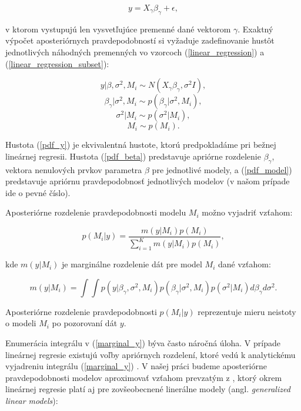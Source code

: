\begin{equation} \label{linear_regression_subset}
y = X_{\gamma} \beta_{\gamma} + \epsilon,
\end{equation}

v ktorom vystupujú len vysvetľujúce premenné dané vektorom \( \gamma \).
Exaktný výpočet aposteriórnych pravdepodobností si vyžaduje zadefinovanie hustôt jednotlivých náhodných premenných vo vzorcoch (\ref{linear_regression}) a (\ref{linear_regression_subset}):

\begin{equation} \label{pdf_y}
    y | \beta, \sigma^2, M_i \sim N(X_{\gamma} \beta_{\gamma}, \sigma^2 I),
\end{equation}
\begin{equation} \label{pdf_beta}
    \beta_{\gamma} | \sigma^2, M_i \sim p(\beta_{\gamma} | \sigma^2, M_i),
\end{equation}
\[
    \sigma^2 | M_i \sim p(\sigma^2 | M_i),
\]
\begin{equation} \label{pdf_model}
    M_i \sim p(M_i).
\end{equation}

Hustota (\ref{pdf_y}) je ekvivalentná hustote, ktorú predpokladáme pri bežnej lineárnej regresii.
Hustota (\ref{pdf_beta}) predstavuje apriórne rozdelenie \( \beta_{\gamma}\), vektora nenulových prvkov parametra \(\beta\) pre jednotlivé modely,
a (\ref{pdf_model}) predstavuje apriórnu pravdepodobnosť jednotlivých modelov (v našom prípade ide o pevné číslo).

Aposteriórne rozdelenie pravdepodobnosti modelu \(M_i\) možno vyjadriť vzťahom:

\[
    p(M_i | y) = \frac{m(y | M_i) p(M_i)}{\sum_{i = 1}^{K} m(y | M_i) p(M_i)},
\]

kde \( m(y | M_i) \) je marginálne rozdelenie dát pre model \(M_i\) dané vzťahom:

\begin{equation} \label{marginal_y}
    m(y | M_i) = \int \int p(y | \beta_{\gamma}, \sigma^2, M_i) p(\beta_{\gamma} | \sigma^2, M_i) p(\sigma^2 | M_i) d\beta_{\gamma} d\sigma^2.
\end{equation}

Aposteriórne rozdelenie pravdepodobnosti \( p(M_i | y) \) reprezentuje mieru neistoty o modeli \(M_i\) po pozorovaní dát \(y\).

Enumerácia integrálu v (\ref{marginal_y}) býva často náročná úloha.
V prípade lineárnej regresie existujú voľby apriórnych rozdelení, ktoré vedú k analytickému vyjadreniu integrálu (\ref{marginal_y}) \cite{mcculloch}.
V našej práci budeme aposteriórne pravdepodobnosti modelov aproximovať vzťahom prevzatým z \cite{jamespress},
ktorý okrem lineárnej regresie platí aj pre zovšeobecnené linerálne modely (angl. \emph{generalized linear models}):

